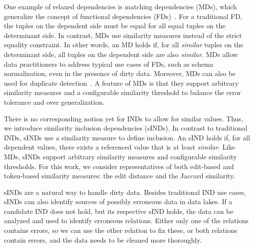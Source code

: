 One example of relaxed dependencies is matching dependencies (MDs), which generalize the concept of functional dependencies (FDs)~\cite{MDDiscovery}.
For a traditional FD, the tuples on the dependent side must be equal for all equal tuples on the determinant side.
In contrast, MDs use similarity measures instead of the strict equality constraint.
In other words, an MD holds if, for all \emph{similar} tuples on the determinant side, all tuples on the dependent side are also \emph{similar}.
MDs allow data practitioners to address typical use cases of FDs, such as schema normalization, even in the presence of dirty data.
Moreover, MDs can also be used for duplicate detection~\cite{MDDiscovery}.
A feature of MDs is that they support arbitrary similarity measures and a configurable similarity threshold to balance the error tolerance and over generalization.

There is no corresponding notion yet for INDs to allow for similar values.
Thus, we introduce similarity inclusion dependencies (sINDs).
In contrast to traditional INDs, sINDs use a similarity measure to define inclusion.
An sIND holds if, for all dependent values, there exists a referenced value that is at least \emph{similar}. Like MDs, sINDs support arbitrary similarity measures and configurable similarity thresholds. For this work, we consider representatives of both edit-based and token-based similarity measures: the edit distance and the Jaccard similarity.

sINDs are a natural way to handle dirty data.
Besides traditional IND use cases, sINDs can also identify sources of possibly erroneous data in data lakes.
If a candidate IND does not hold, but its respective sIND holds, the data can be analyzed and used to identify erroneous relations.
Either only one of the relations contains errors, so we can use the other relation to fix these, or both relations contain errors, and the data needs to be cleaned more thoroughly.

